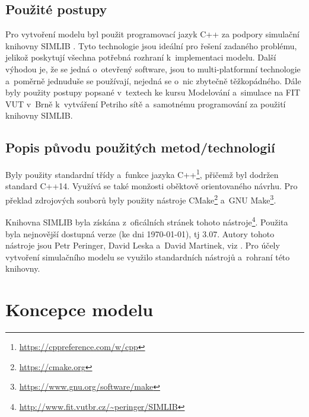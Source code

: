 \documentclass[a4paper, 11pt]{article}
\begin{document}
	\subsection{Použité postupy}

	Pro vytvoření modelu byl použit programovací jazyk C++ za podpory
	simulační knihovny SIMLIB \cite{SIMLIB}. Tyto technologie jsou ideální pro
	řešení zadaného problému, jelikož poskytují všechna potřebná rozhraní
	k~implementaci modelu. Další výhodou je, že se jedná o~otevřený software,
	jsou to multi-platformní technologie a~poměrně jednuduše se používají,
	nejedná se o~nic zbytečně těžkopádného. Dále byly použity postupy popsané
	v~textech ke kursu Modelování a~simulace na FIT VUT v~Brně \cite{IMS_slides}
	k~vytváření Petriho sítě \cite[snímek 123]{IMS_slides} a~samotnému
	programování za použití knihovny SIMLIB.


	\subsection{Popis původu použitých metod/technologií}

	Byly použity standardní třídy a~funkce jazyka
	C++\footnote{\url{https://cppreference.com/w/cpp}}, přičemž
	byl dodržen standard C++14. Využívá se také monžosti oběktově
	orientovaného návrhu. Pro překlad zdrojových souborů byly použity nástroje
	CMake\footnote{\url{https://cmake.org}}
	a~GNU Make\footnote{\url{https://www.gnu.org/software/make}}.

	Knihovna SIMLIB byla získána z~oficálních stránek tohoto
	nástroje\footnote{\url{http://www.fit.vutbr.cz/~peringer/SIMLIB}}.
	Použita byla nejnovější dostupná verze (ke dni \today), tj 3.07.
	Autory tohoto nástroje jsou Petr Peringer, David Leska a~David Martinek,
	viz \cite{SIMLIB}. Pro účely vytvoření simulačního modelu
	\cite[snímek 44]{IMS_slides} se využilo standardních nástrojů
	a~rohraní této knihovny.



	\section{Koncepce modelu}
\end{document}
